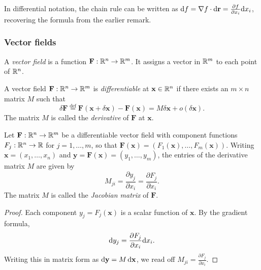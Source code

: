 \documentclass[a4paper]{article}
\begin{document}
\begin{rmk}
  In differential notation, the chain rule can be written as $\mathrm{d} f = \nabla f \cdot \mathrm{d}\mathbf{r} = \frac{\partial f}{\partial x_i}\mathrm{d} x_i$, recovering the formula from the earlier remark.
\end{rmk}

\subsubsection*{Vector fields }

\begin{defi}
  A \emph{vector field} is a function $\mathbf{F}: \mathbb{R}^n\to \mathbb{R}^m$. It assigns a vector in $\mathbb{R}^m$ to each point of $\mathbb{R}^n$.
\end{defi}

\begin{defi}
  A vector field $\mathbf{F}: \mathbb{R}^n \to \mathbb{R}^m$ is \emph{differentiable} at $\mathbf{x} \in \mathbb{R}^n$ if there exists an $m\times n$ matrix $M$ such that
  \[
    \delta \mathbf{F} \stackrel{\text{def}}{=} \mathbf{F}(\mathbf{x} + \delta\mathbf{x}) - \mathbf{F}(\mathbf{x}) = M\delta\mathbf{x} + o(\delta \mathbf{x}).
  \]
  The matrix $M$ is called the \emph{derivative} of $\mathbf{F}$ at $\mathbf{x}$.
\end{defi}

\begin{thm}
  Let $\mathbf{F}: \mathbb{R}^n \to \mathbb{R}^m$ be a differentiable vector field with component functions $F_j: \mathbb{R}^n \to \mathbb{R}$ for $j = 1, \ldots, m$, so that $\mathbf{F}(\mathbf{x}) = (F_1(\mathbf{x}), \ldots, F_m(\mathbf{x}))$. Writing $\mathbf{x} = (x_1, \ldots, x_n)$ and $\mathbf{y} = \mathbf{F}(\mathbf{x}) = (y_1, \ldots, y_m)$, the entries of the derivative matrix $M$ are given by
  \[
    M_{ji} = \frac{\partial y_j}{\partial x_i} = \frac{\partial F_j}{\partial x_i}.
  \]
  The matrix $M$ is called the \emph{Jacobian matrix} of $\mathbf{F}$.
\end{thm}

\begin{proof}
  Each component $y_j = F_j(\mathbf{x})$ is a scalar function of $\mathbf{x}$. By the gradient formula,
  \[
    \mathrm{d} y_j = \frac{\partial F_j}{\partial x_i} \mathrm{d} x_i.
  \]
  Writing this in matrix form as $\mathrm{d} \mathbf{y} = M\,\mathrm{d} \mathbf{x}$, we read off $M_{ji} = \frac{\partial F_j}{\partial x_i}$.
\end{proof}
\end{document}

